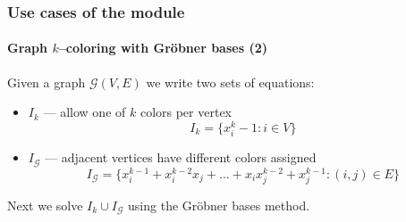 \documentclass[10pt,polish]{beamer}
\begin{document}
\begin{frame}
    \frametitle{Use cases of the module}
    \framesubtitle{Graph $k$--coloring with Gr\"{o}bner bases (2)}

    Given a graph $\mathcal{G}(V, E)$ we write two sets of equations:
    \begin{itemize}
        \pause
        \item $I_k$ --- allow one of $k$ colors per vertex
            \begin{equation*}
                I_k = \{ x_i^k - 1 : i \in V \}
            \end{equation*}
        \pause
        \item $I_{\mathcal{G}}$ --- adjacent vertices have different colors assigned
            \begin{equation*}
                I_{\mathcal{G}} = \{ x_{i}^{k-1} + x_{i}^{k-2} x_{j} + \ldots + x_{i} x_{j}^{k-2} + x_{j}^{k-1} : (i, j) \in E \}
            \end{equation*}
    \end{itemize}
    \pause
    Next we solve $I_k \cup I_{\mathcal{G}}$ using the Gr\"{o}bner bases method.
\end{frame}
\end{document}
